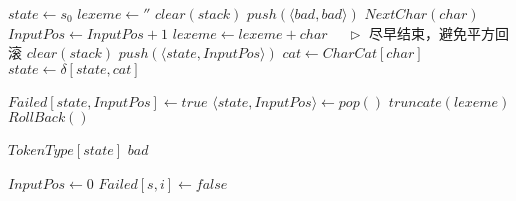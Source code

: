 \documentclass[varwidth=\maxdimen]{standalone}
\newcommand{\LeftComment}[1]{$\quad\triangleright$ #1}
\begin{document}
\begin{algorithmic}[1] %
    \State $state \gets s_0$
    \State $lexeme \gets ''$
    \State $clear(stack)$
    \State $push(\langle bad, bad\rangle)$
      \State $NextChar(char)$
      \State $InputPos \gets InputPos+1$
      \State $lexeme \gets lexeme+char$
        \Break \LeftComment{尽早结束，避免平方回滚}
      \EndIf
        \State $clear(stack)$
      \EndIf
      \State $push(\langle state, InputPos\rangle)$
      \State $cat \gets CharCat[char]$
      \State $state \gets \delta[state,cat]$
    \EndWhile
    
      \State $Failed[state,InputPos] \gets true$
      \State $\langle state, InputPos\rangle \gets pop()$
      \State $truncate(lexeme)$
      \State $RollBack()$
    \EndWhile

      \StateReturn $TokenType[state]$
    \Else
      \StateReturn $bad$
    \EndIf
    
  \EndFunction

  \State

    \State $InputPos \gets 0$
        \State $Failed[s,i] \gets false$
      \EndFor
    \EndFor
  \EndFunction
\end{algorithmic}
\end{document}
